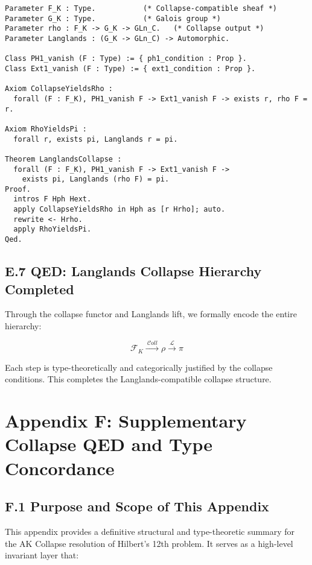 \documentclass[11pt]{article}
\begin{document}
\begin{lstlisting}[language=Coq, caption={Coq Encoding: Langlands Collapse}]
Parameter F_K : Type.           (* Collapse-compatible sheaf *)
Parameter G_K : Type.           (* Galois group *)
Parameter rho : F_K -> G_K -> GLn_C.   (* Collapse output *)
Parameter Langlands : (G_K -> GLn_C) -> Automorphic.

Class PH1_vanish (F : Type) := { ph1_condition : Prop }.
Class Ext1_vanish (F : Type) := { ext1_condition : Prop }.

Axiom CollapseYieldsRho :
  forall (F : F_K), PH1_vanish F -> Ext1_vanish F -> exists r, rho F = r.

Axiom RhoYieldsPi :
  forall r, exists pi, Langlands r = pi.

Theorem LanglandsCollapse :
  forall (F : F_K), PH1_vanish F -> Ext1_vanish F ->
    exists pi, Langlands (rho F) = pi.
Proof.
  intros F Hph Hext.
  apply CollapseYieldsRho in Hph as [r Hrho]; auto.
  rewrite <- Hrho.
  apply RhoYieldsPi.
Qed.
\end{lstlisting}

\subsection*{E.7 QED: Langlands Collapse Hierarchy Completed}

Through the collapse functor and Langlands lift, we formally encode the entire hierarchy:

\[
\mathcal{F}_K \xrightarrow{\ \mathcal{C}oll\ } \rho \xrightarrow{\ \mathcal{L}\ } \pi
\]

Each step is type-theoretically and categorically justified by the collapse conditions.  
This completes the Langlands-compatible collapse structure.



\appendix
\section*{Appendix F: Supplementary Collapse QED and Type Concordance}

\subsection*{F.1 Purpose and Scope of This Appendix}

This appendix provides a definitive structural and type-theoretic summary for the AK Collapse resolution of Hilbert’s 12th problem.  
It serves as a high-level invariant layer that:
\end{document}
